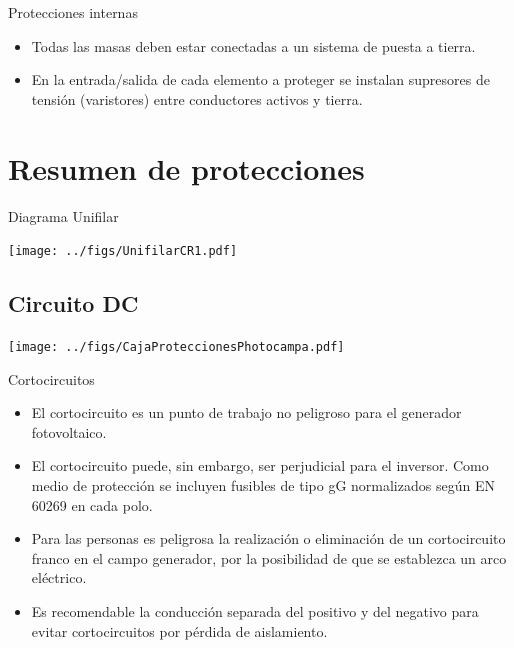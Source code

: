 \documentclass[aspectratio=169, usenames,svgnames,dvipsnames]{beamer}
\begin{document}
\begin{frame}[label={sec:org50e6cfc}]{Protecciones internas}
\begin{itemize}
\item \alert{Todas las masas deben estar conectadas a un sistema de puesta a
tierra}.

\item En la entrada/salida de cada elemento a proteger se instalan
\alert{supresores de tensión (varistores)} entre conductores activos y
tierra.
\end{itemize}
\end{frame}

\section{Resumen de protecciones}
\label{sec:org7504087}

\begin{frame}[label={sec:org328d8c2},plain]{Diagrama Unifilar}
\begin{center}
\texttt{[image: ../figs/UnifilarCR1.pdf]}
\end{center}
\end{frame}

\subsection{Circuito DC}
\label{sec:org121dc16}
\begin{frame}[label={sec:org882849e}]{}
\begin{center}
\texttt{[image: ../figs/CajaProteccionesPhotocampa.pdf]}
\end{center}
\end{frame}


\begin{frame}[label={sec:org6f7c91f}]{Cortocircuitos}
\begin{itemize}
\item El \alert{cortocircuito} es un punto de trabajo \alert{no peligroso para el
generador fotovoltaico}.

\item El cortocircuito puede, sin embargo, ser \alert{perjudicial para el
inversor}. Como medio de protección se incluyen fusibles de tipo gG
normalizados según EN 60269 en cada polo.

\item Para las personas es \alert{peligrosa la realización o eliminación de un
cortocircuito franco en el campo generador}, por la posibilidad de
que se establezca un arco eléctrico.

\item Es recomendable la \alert{conducción separada} del positivo y del negativo
para evitar cortocircuitos por pérdida de aislamiento.
\end{itemize}
\end{frame}
\end{document}
